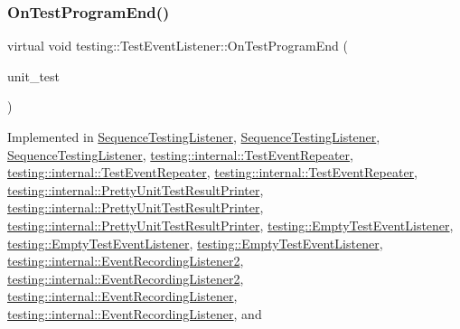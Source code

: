 \subsubsection{\texorpdfstring{OnTestProgramEnd()}{OnTestProgramEnd()}\hspace{0.1cm}{\footnotesize\ttfamily [1/3]}}
{\footnotesize\ttfamily virtual void testing\+::\+Test\+Event\+Listener\+::\+On\+Test\+Program\+End (\begin{DoxyParamCaption}\item[{const \mbox{\hyperlink{classtesting_1_1_unit_test}{Unit\+Test}} \&}]{unit\+\_\+test }\end{DoxyParamCaption})\hspace{0.3cm}{\ttfamily [pure virtual]}}



Implemented in \mbox{\hyperlink{class_sequence_testing_listener_aacac5e15bac089460841ff63a5c31f57}{Sequence\+Testing\+Listener}}, \mbox{\hyperlink{class_sequence_testing_listener_a506077b57a6789daf900e61285a58d8a}{Sequence\+Testing\+Listener}}, \mbox{\hyperlink{class_sequence_testing_listener_a506077b57a6789daf900e61285a58d8a}{Sequence\+Testing\+Listener}}, \mbox{\hyperlink{classtesting_1_1internal_1_1_test_event_repeater_a255378258ea0d14688303d4a6421746f}{testing\+::internal\+::\+Test\+Event\+Repeater}}, \mbox{\hyperlink{classtesting_1_1internal_1_1_test_event_repeater_a255378258ea0d14688303d4a6421746f}{testing\+::internal\+::\+Test\+Event\+Repeater}}, \mbox{\hyperlink{classtesting_1_1internal_1_1_test_event_repeater_a4622616259747dbcc23f5ee39ef99ec0}{testing\+::internal\+::\+Test\+Event\+Repeater}}, \mbox{\hyperlink{classtesting_1_1internal_1_1_pretty_unit_test_result_printer_a26c7e1a921099dd50fbadd2b0ce3692a}{testing\+::internal\+::\+Pretty\+Unit\+Test\+Result\+Printer}}, \mbox{\hyperlink{classtesting_1_1internal_1_1_pretty_unit_test_result_printer_a26c7e1a921099dd50fbadd2b0ce3692a}{testing\+::internal\+::\+Pretty\+Unit\+Test\+Result\+Printer}}, \mbox{\hyperlink{classtesting_1_1internal_1_1_pretty_unit_test_result_printer_a8c92c062889abdb940b04ffe113f5980}{testing\+::internal\+::\+Pretty\+Unit\+Test\+Result\+Printer}}, \mbox{\hyperlink{classtesting_1_1_empty_test_event_listener_aaa9d683e8e0c850af67a0b92d785ddb9}{testing\+::\+Empty\+Test\+Event\+Listener}}, \mbox{\hyperlink{classtesting_1_1_empty_test_event_listener_aaa9d683e8e0c850af67a0b92d785ddb9}{testing\+::\+Empty\+Test\+Event\+Listener}}, \mbox{\hyperlink{classtesting_1_1_empty_test_event_listener_a0abcc02bd2331a2e29ad6f4d9daf2a32}{testing\+::\+Empty\+Test\+Event\+Listener}}, \mbox{\hyperlink{classtesting_1_1internal_1_1_event_recording_listener2_a95aeef757bba790c159b5a422030a86b}{testing\+::internal\+::\+Event\+Recording\+Listener2}}, \mbox{\hyperlink{classtesting_1_1internal_1_1_event_recording_listener2_a95aeef757bba790c159b5a422030a86b}{testing\+::internal\+::\+Event\+Recording\+Listener2}}, \mbox{\hyperlink{classtesting_1_1internal_1_1_event_recording_listener_a22952f706a15c028d4b43256602035bb}{testing\+::internal\+::\+Event\+Recording\+Listener}}, \mbox{\hyperlink{classtesting_1_1internal_1_1_event_recording_listener_a22952f706a15c028d4b43256602035bb}{testing\+::internal\+::\+Event\+Recording\+Listener}}, and 